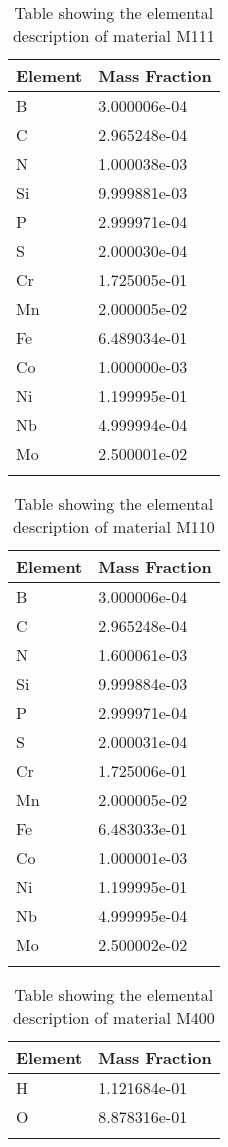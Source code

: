 \begin{centering}
\begin{longtable}[ht!]
{ p{} | p{} }
\hline
Element & Mass Fraction\\
\hline
B &  3.000006e-04\\
C &  2.965248e-04\\
N &  1.000038e-03\\
Si &  9.999881e-03\\
P &  2.999971e-04\\
S &  2.000030e-04\\
Cr &  1.725005e-01\\
Mn &  2.000005e-02\\
Fe &  6.489034e-01\\
Co &  1.000000e-03\\
Ni &  1.199995e-01\\
Nb &  4.999994e-04\\
Mo &  2.500001e-02\\
\caption{Table showing the elemental description of material M111}
\label{table:material_M111}
\end{longtable}
\clearpage


\begin{longtable}[ht!]
  { p{} | p{} }
\hline
Element & Mass Fraction\\
\hline
B &  3.000006e-04\\
C &  2.965248e-04\\
N &  1.600061e-03\\
Si &  9.999884e-03\\
P &  2.999971e-04\\
S &  2.000031e-04\\
Cr &  1.725006e-01\\
Mn &  2.000005e-02\\
Fe &  6.483033e-01\\
Co &  1.000001e-03\\
Ni &  1.199995e-01\\
Nb &  4.999995e-04\\
Mo &  2.500002e-02\\
\caption{Table showing the elemental description of material M110}
\label{table:material_M110}
\end{longtable}
\clearpage

\begin{longtable}[ht!]
  { p{} | p{} }
\hline
Element & Mass Fraction\\
\hline
H &  1.121684e-01\\
O &  8.878316e-01\\
\caption{Table showing the elemental description of material M400}
\label{table:material_M400}
\end{longtable}
\clearpage


\end{centering}
